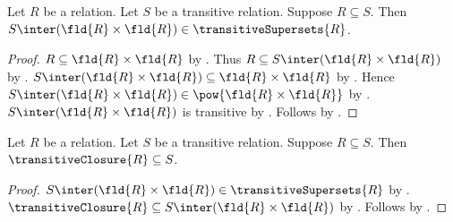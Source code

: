 \begin{lemma}\label{transitive_closure_candidate}
    Let $R$ be a relation.
    Let $S$ be a transitive relation.
    Suppose $R\subseteq S$.
    Then $S\inter(\fld{R}\times\fld{R})\in\transitiveSupersets{R}$.
\end{lemma}
\begin{proof}
    $R\subseteq\fld{R}\times\fld{R}$
        by .
    Thus $R\subseteq S\inter(\fld{R}\times\fld{R})$
        by .
    $S\inter(\fld{R}\times\fld{R})\subseteq\fld{R}\times\fld{R}$
        by .
    Hence $S\inter(\fld{R}\times\fld{R})
        \in\pow{\fld{R}\times\fld{R}}$ by .
    $S\inter(\fld{R}\times\fld{R})$ is transitive
        by .
    Follows by .
\end{proof}

\begin{proposition}\label{transitive_closure_least}
    Let $R$ be a relation.
    Let $S$ be a transitive relation.
    Suppose $R\subseteq S$.
    Then $\transitiveClosure{R}\subseteq S$.
\end{proposition}
\begin{proof}
    $S\inter(\fld{R}\times\fld{R})\in\transitiveSupersets{R}$
        by .
    $\transitiveClosure{R}\subseteq S\inter(\fld{R}\times\fld{R})$
        by .
    Follows by .
\end{proof}

